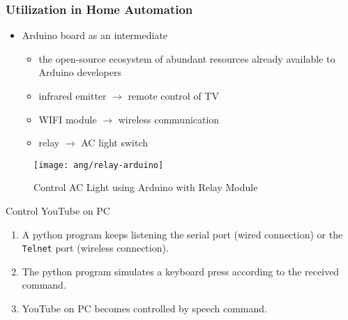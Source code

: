 
\begin{frame}
\frametitle{Utilization in Home Automation}
\begin{itemize}
	\item Arduino\textsuperscript{\textregistered} board as an intermediate
		\begin{itemize}
		\item the open-source ecosystem of abundant resources already available to Arduino developers
		\item infrared emitter $\longrightarrow$ remote control of TV
		\item WIFI module $\longrightarrow$ wireless communication
		\item relay $\longrightarrow$ AC light switch
		\end{itemize}
\end{itemize}

\begin{figure}[H]
\centering
\texttt{[image: ang/relay-arduino]}
\caption{Control AC Light using Arduino with Relay Module \cite{relay-arduino}}
\end{figure}
\end{frame}

\begin{frame}
Control YouTube on PC
\begin{enumerate}
	\item A python program keeps listening the serial port (wired connection) or the \texttt{Telnet} port (wireless connection).
	\item The python program simulates a keyboard press according to the received command.
	\item YouTube on PC becomes controlled by speech command.
\end{enumerate}
\end{frame}
